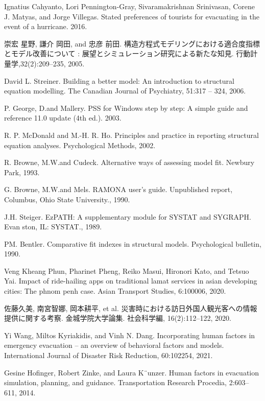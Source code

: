 \documentclass[letterpaper,12pt,titlepage,oneside,final,a4j,dvipdfmx]{book}
\begin{document}
\begin{thebibliography}{50}
 Ignatius Cahyanto, Lori Pennington-Gray, Sivaramakrishnan Srinivasan, Corene J.
Matyas, and Jorge Villegas. Stated preferences of tourists for evacuating in the event
of a hurricane. 2016.

 崇宏 星野, 謙介 岡田, and 忠彦 前田. 構造方程式モデリングにおける適合度指標とモデル改善について : 展望とシミュレーション研究による新たな知見. 行動計量学,32(2):209–235, 2005.

 David L. Streiner. Building a better model: An introduction to structural equation modelling. The Canadian Journal of Psychiatry, 51:317 – 324, 2006.


 P. George, D.and Mallery. PSS for Windows step by step: A simple guide and reference 11.0 update (4th ed.). 2003.

 R. P. McDonald and M.-H. R. Ho. Principles and practice in reporting structural equation analyses. Psychological Methods, 2002.

  R. Browne, M.W.and Cudeck. Alternative ways of assessing model fit. Newbury Park, 1993.

  G. Browne, M.W.and Mels. RAMONA user's guide. Unpublished report, Columbus, Ohio State University., 1990.

  J.H. Steiger. EzPATH: A supplementary module for SYSTAT and SYGRAPH. Evan ston, IL: SYSTAT., 1989.

 PM. Bentler. Comparative fit indexes in structural models. Psychological bulletin, 1990.

  Veng Kheang Phun, Pharinet Pheng, Reiko Masui, Hironori Kato, and Tetsuo Yai. Impact of ride-hailing apps on traditional lamat services in asian developing cities: The phnom penh case. Asian Transport Studies, 6:100006, 2020.


 佐藤久美, 南宮智娜, 岡本耕平, et al. 災害時における訪日外国人観光客への情報提供に関する考察. 金城学院大学論集. 社会科学編, 16(2):112–122, 2020.


  Yi Wang, Miltos Kyriakidis, and Vinh N. Dang. Incorporating human factors in emergency evacuation – an overview of behavioral factors and models. International Journal of Disaster Risk Reduction, 60:102254, 2021.

 Gesine Hofinger, Robert Zinke, and Laura K¨unzer. Human factors in evacuation simulation, planning, and guidance. Transportation Research Procedia, 2:603–611, 2014.



\end{thebibliography}
\end{document}
